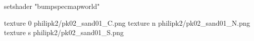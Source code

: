 setshader "bumpspecmapworld"

texture 0 philipk2/pk02_sand01_C.png
texture n philipk2/pk02_sand01_N.png
texture s philipk2/pk02_sand01_S.png

